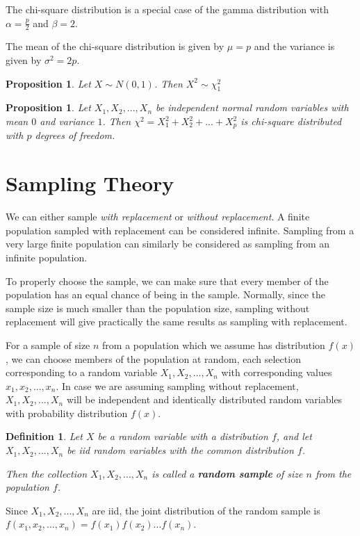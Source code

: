 \documentclass[12pt,twoside]{report}
\newtheorem{defn}{Definition}
\newtheorem{prop}[subsection]{Proposition}
\begin{document}
The chi-square distribution is a special case of the gamma distribution with $\alpha = \frac{p}{2}$ and $\beta = 2$.

The mean of the chi-square distribution is given by $\mu = p$ and the variance is given by $\sigma^2 = 2p$.

\begin{prop}
Let $X \sim N(0,1)$. Then $X^2 \sim \chi_1^2$
\end{prop}

\begin{prop}
    Let $X_1, X_2, ..., X_n$ be independent normal random variables with mean $0$ and variance $1$. Then $\chi^2 = X_1^2 + X_2^2 + ... + X_p^2$ is chi-square distributed with $p$ degrees of freedom.
\end{prop}

\section{Sampling Theory}
We can either sample \textit{with replacement} or \textit{without replacement}. A finite population sampled with replacement can be considered infinite. Sampling from a very large finite population can similarly be considered as sampling from an infinite population. 

To properly choose the sample, we can make sure that every member of the population has an equal chance of being in the sample.
Normally, since the sample size is much smaller than the population size, sampling without replacement will give practically the same results as sampling with replacement.

For a sample of size $n$ from a population which we assume has distribution $f(x)$, we can choose members of the population at random, each selection corresponding to a random variable $X_1, X_2, ..., X_n$ with corresponding values $x_1, x_2, ..., x_n$. In case we are assuming sampling without replacement, $X_1, X_2, ..., X_n$ will be independent and identically distributed random variables with probability distribution $f(x)$.

\begin{defn}
Let $X$ be a random variable with a distribution $f$, and let $X_1, X_2, ..., X_n$ be iid random variables with the common distribution $f$.

Then the collection $X_1, X_2, ..., X_n$ is called a \textbf{random sample} of size $n$ from the population $f$.
\end{defn}

Since $X_1, X_2, ..., X_n$ are iid, the joint distribution of the random sample is $f(x_1, x_2, ..., x_n) = f(x_1) f(x_2) ... f(x_n)$.
\end{document}

